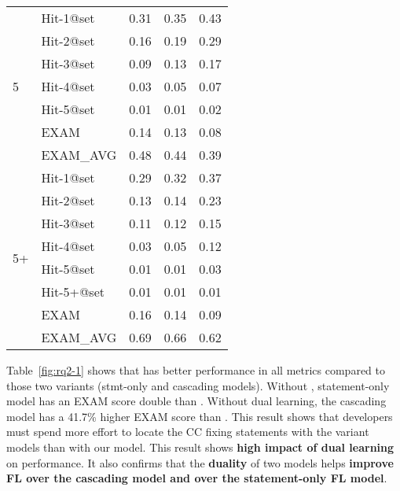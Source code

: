 \begin{table}[b]
{\begin{center}
\begin{tabular}{p{1cm}<{\centering}|p{1.5cm}<{\centering}|p{1.5cm}<{\centering}|p{1.5cm}<{\centering}|p{1.2cm}<{\centering}}
				\hline
				\multirow{7}{*}{5}  & Hit-1@set     & 0.31 & 0.35 & 0.43 \\
									& Hit-2@set     & 0.16 & 0.19 & 0.29 \\
									& Hit-3@set     & 0.09 & 0.13 & 0.17 \\
									& Hit-4@set     & 0.03 & 0.05 & 0.07 \\
									& Hit-5@set     & 0.01 & 0.01 & 0.02 \\
									& EXAM          & 0.14 & 0.13 & 0.08 \\
									& EXAM\_AVG     & 0.48 & 0.44 & 0.39 \\
				\hline
				\multirow{8}{*}{5+}  & Hit-1@set     & 0.29 & 0.32 & 0.37 \\
									& Hit-2@set     & 0.13 & 0.14 & 0.23 \\
									& Hit-3@set     & 0.11 & 0.12 & 0.15 \\
									& Hit-4@set     & 0.03 & 0.05 & 0.12 \\
									& Hit-5@set     & 0.01 & 0.01 & 0.03 \\
									& Hit-5+@set    & 0.01 & 0.01 & 0.01 \\
									& EXAM          & 0.16 & 0.14 & 0.09 \\
									& EXAM\_AVG     & 0.69 & 0.66 & 0.62 \\
				\hline
			\end{tabular}
			
			\label{fig:rq2}
		\end{center}
	}
\end{table}
\fi

Table~\ref{fig:rq2-1} shows that {\tool} has better performance in all
metrics compared to those two variants (stmt-only and cascading
models).
Without , statement-only model has an EXAM score double
than {\tool}. Without dual learning, the cascading model has a 41.7\%
higher EXAM score than {\tool}. This result shows that developers must
spend more effort to locate the CC fixing statements with the variant
models than with our model. This result shows {\bf high impact of
dual learning} on performance. It also confirms that the {\bf duality} of
two models helps {\bf improve FL over the cascading model and over the
statement-only FL model}.



